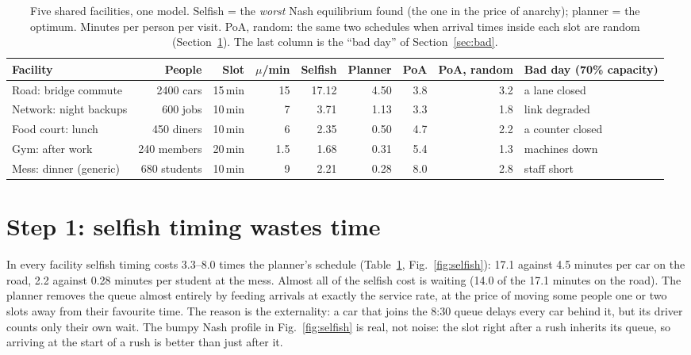 \documentclass{article}
\begin{document}
\begin{table}[t]\centering\small
\caption{Five shared facilities, one model. Selfish = the \emph{worst} Nash equilibrium found (the one in the price of
anarchy); planner = the optimum. Minutes per person per visit. PoA, random: the same two schedules when arrival times
inside each slot are random (Section~\ref{sec:selfish}). The last column is the ``bad day'' of Section~\ref{sec:bad}.}\label{tab:domains}
\setlength{\tabcolsep}{4pt}
\begin{tabular}{@{}lrrrrrrrl@{}}\toprule
Facility & People & Slot & $\mu$/min & Selfish & Planner & PoA & PoA, random & Bad day (70\% capacity)\\\midrule
Road: bridge commute & 2400 cars & 15\,min & 15 & 17.12 & 4.50 & 3.8 & 3.2 & a lane closed\\
Network: night backups & 600 jobs & 10\,min & 7 & 3.71 & 1.13 & 3.3 & 1.8 & link degraded\\
Food court: lunch & 450 diners & 10\,min & 6 & 2.35 & 0.50 & 4.7 & 2.2 & a counter closed\\
Gym: after work & 240 members & 20\,min & 1.5 & 1.68 & 0.31 & 5.4 & 1.3 & machines down\\
Mess: dinner (generic) & 680 students & 10\,min & 9 & 2.21 & 0.28 & 8.0 & 2.8 & staff short\\\bottomrule
\end{tabular}
\end{table}

\section{Step 1: selfish timing wastes time}\label{sec:selfish}
In every facility selfish timing costs 3.3--8.0 times the planner's schedule (Table~\ref{tab:domains},
Fig.~\ref{fig:selfish}): 17.1 against 4.5 minutes per car on the road, 2.2 against 0.28 minutes per student at the
mess. Almost all of the selfish cost is waiting (14.0 of the 17.1 minutes on the road). The planner removes the queue
almost entirely by feeding arrivals at exactly the service rate, at the price of moving some people one or two slots
away from their favourite time. The reason is the externality: a car that joins the 8:30 queue delays every car
behind it, but its driver counts only their own wait. The bumpy Nash profile in Fig.~\ref{fig:selfish} is real, not
noise: the slot right after a rush inherits its queue, so arriving at the start of a rush is better than just after it.
\end{document}
